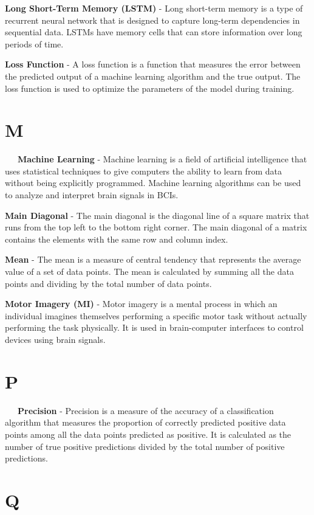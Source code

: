 \textbf{Long Short-Term Memory (LSTM)} - Long short-term memory is a type of recurrent neural network that is designed to capture long-term dependencies in sequential data. LSTMs have memory cells that can store information over long periods of time.

\textbf{Loss Function} - A loss function is a function that measures the error between the predicted output of a machine learning algorithm and the true output. The loss function is used to optimize the parameters of the model during training.

\section*{M}

\-\ \-\ \-\ \textbf{Machine Learning} - Machine learning is a field of artificial intelligence that uses statistical techniques to give computers the ability to learn from data without being explicitly programmed. Machine learning algorithms can be used to analyze and interpret brain signals in BCIs.

\textbf{Main Diagonal} - The main diagonal is the diagonal line of a square matrix that runs from the top left to the bottom right corner. The main diagonal of a matrix contains the elements with the same row and column index.

\textbf{Mean} - The mean is a measure of central tendency that represents the average value of a set of data points. The mean is calculated by summing all the data points and dividing by the total number of data points.

\textbf{Motor Imagery (MI)} - Motor imagery is a mental process in which an individual imagines themselves performing a specific motor task without actually performing the task physically. It is used in brain-computer interfaces to control devices using brain signals.

\section*{P}

\-\ \-\ \-\ \textbf{Precision} - Precision is a measure of the accuracy of a classification algorithm that measures the proportion of correctly predicted positive data points among all the data points predicted as positive. It is calculated as the number of true positive predictions divided by the total number of positive predictions.

\section*{Q}

